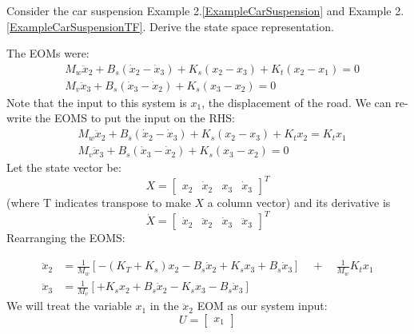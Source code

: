 \begin{Example}\label{suspensionstatespace}
Consider the car suspension
Example 2.\ref{ExampleCarSuspension} and Example 2.\ref{ExampleCarSuspensionTF}.
\vspace{0.2in}
Derive the state space representation.

The EOMs were:
\begin{align*}
&M_w\ddot{x}_2+B_s(\dot{x}_2-\dot{x}_3)+K_s(x_2-x_3)+K_t(x_2-x_1) =0 \\
&M_v\ddot{x}_3+B_s(\dot{x}_3-\dot{x}_2)+K_s(x_3-x_2) = 0
\end{align*}
Note that the input to this system is $x_1$, the displacement of the road.  We  can
re-write the EOMS to put the input on the RHS:
\begin{align*}
&M_w\ddot{x}_2+B_s(\dot{x}_2-\dot{x}_3)+K_s(x_2-x_3)+K_tx_2 = K_tx_1 \\
&M_v\ddot{x}_3+B_s(\dot{x}_3-\dot{x}_2)+K_s(x_3-x_2) = 0
\end{align*}
Let the state vector be:
\[
X = \begin{bmatrix}x_2 & \dot{x}_2 & x_3 & \dot{x}_3\end{bmatrix}^T
\]
(where T indicates transpose to make $X$ a column vector)
and its derivative is
\[
\dot{X} = \begin{bmatrix}\dot{x}_2 & \ddot{x}_2 & \dot{x}_3 & \ddot{x}_3\end{bmatrix}^T
\]
Rearranging the EOMS:

\begin{align*}
\ddot{x}_2  &= \frac{1}{M_w}\left [-(K_T+K_s)x_2-B_s\dot{x}_2+K_sx_3+B_s\dot{x}_3\right]\quad+\quad \frac{1}{M_w}K_tx_1 \\
\ddot{x}_3 &= \frac{1}{M_v}\left[+K_sx_2+B_s\dot{x}_2 -K_sx_3-B_s\dot{x}_3\right]
\end{align*}
We will treat the variable $x_1$ in the $\ddot{x}_2$ EOM as our system input:
\[
U = \begin{bmatrix}x_1\end{bmatrix}
\]


\end{Example}
